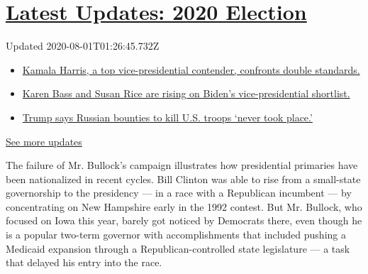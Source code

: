 \hypertarget{latest-updates-2020-election}{%
\section{\texorpdfstring{\href{https://www.nytimes.com/2020/07/31/us/elections/biden-vs-trump.html?action=click\&pgtype=Article\&state=default\&region=MAIN_CONTENT_1\&context=storylines_live_updates}{Latest
Updates: 2020
Election}}{Latest Updates: 2020 Election}}\label{latest-updates-2020-election}}

Updated 2020-08-01T01:26:45.732Z

\begin{itemize}
\tightlist
\item
  \href{https://www.nytimes.com/2020/07/31/us/elections/biden-vs-trump.html?action=click\&pgtype=Article\&state=default\&region=MAIN_CONTENT_1\&context=storylines_live_updates\#link-29fdff45}{Kamala
  Harris, a top vice-presidential contender, confronts double
  standards.}
\item
  \href{https://www.nytimes.com/2020/07/31/us/elections/biden-vs-trump.html?action=click\&pgtype=Article\&state=default\&region=MAIN_CONTENT_1\&context=storylines_live_updates\#link-13ec3d9c}{Karen
  Bass and Susan Rice are rising on Biden's vice-presidential
  shortlist.}
\item
  \href{https://www.nytimes.com/2020/07/31/us/elections/biden-vs-trump.html?action=click\&pgtype=Article\&state=default\&region=MAIN_CONTENT_1\&context=storylines_live_updates\#link-49e9a016}{Trump
  says Russian bounties to kill U.S. troops `never took place.'}
\end{itemize}

\href{https://www.nytimes.com/2020/07/31/us/elections/biden-vs-trump.html?action=click\&pgtype=Article\&state=default\&region=MAIN_CONTENT_1\&context=storylines_live_updates}{See
more updates}

The failure of Mr. Bullock's campaign illustrates how presidential
primaries have been nationalized in recent cycles. Bill Clinton was able
to rise from a small-state governorship to the presidency --- in a race
with a Republican incumbent --- by concentrating on New Hampshire early
in the 1992 contest. But Mr. Bullock, who focused on Iowa this year,
barely got noticed by Democrats there, even though he is a popular
two-term governor with accomplishments that included pushing a Medicaid
expansion through a Republican-controlled state legislature --- a task
that delayed his entry into the race.

